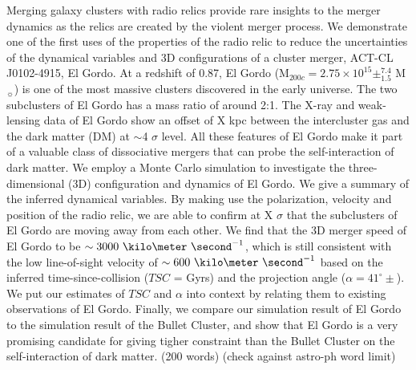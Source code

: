 
Merging galaxy clusters with radio relics provide rare insights to the merger
dynamics as the relics are created by the
violent merger process. We demonstrate one of the first uses of the
properties of the radio relic
to reduce the uncertainties of the dynamical variables 
and 3D configurations of a cluster merger, ACT-CL J0102-4915, El Gordo. 
At a redshift of 0.87, El Gordo (M$_{200c} = 
2.75\times10^{15} \pm^{7.4}_{1.5}$ M$_{\sun}$) is one of the most massive
clusters discovered in the early universe. The two subclusters of El
Gordo has a mass ratio of around 2:1. 
The X-ray and weak-lensing data of El Gordo show an offset of X kpc between
the intercluster gas and the dark matter (DM) at $\sim$4 $\sigma$ level.
All these features of El Gordo make it part of a valuable class of
dissociative mergers that can probe the self-interaction of dark matter.
We employ a Monte Carlo simulation to investigate the three-dimensional (3D)
configuration and dynamics of El Gordo. We give a summary of the inferred
dynamical variables. By making use the polarization, velocity and position
of the radio relic, we are able to confirm at X $\sigma$ that the subclusters of El Gordo are moving away from each other. We find that
the 3D merger speed of El Gordo to be $\sim3000~\kilo\meter~
\second^{-1}$, which is still consistent with the low line-of-sight
velocity of $\sim600~\kilo\meter~\second^{-1}$ based on the inferred time-since-collision ($TSC$ = Gyrs) and
the projection angle (\(\alpha = 41^{\circ}\pm \)). We put our estimates of $TSC$ and $\alpha$ into context by relating them to existing observations of El Gordo. 
Finally, we compare our simulation result of El Gordo to the simulation
result of the Bullet Cluster, and show that
El Gordo is a very promising candidate for giving tigher constraint than
the Bullet Cluster on the self-interaction of dark matter. 
(200 words)
(check against astro-ph word limit)


